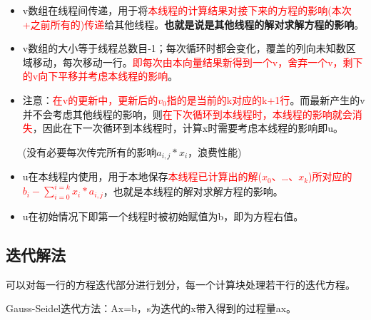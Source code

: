 \documentclass[UTF8]{article}%
\begin{document}
\begin{itemize}
    \item v数组在线程间传递，用于将\textcolor{red}{本线程的计算结果对接下来的方程的影响(本次+之前所有的)传递}给其他线程。\textbf{也就是说是其他线程的解对求解方程的影响}。
    \item v数组的大小等于线程总数目-1；每次循环时都会变化，覆盖的列向未知数区域移动，每次移动一行。\textcolor{red}{即每次由本向量结果新得到一个v，舍弃一个v，剩下的v向下平移并考虑本线程的影响}。
    \item 注意：\textcolor{red}{在v的更新中，更新后的$v_0$指的是当前的k对应的k+1行}。而最新产生的v并不会考虑其他线程的影响，则\textcolor{red}{在下次循环到本线程时，本线程的影响就会消失}，因此在下一次循环到本线程时，计算x时需要考虑本线程的影响即u。
    
    (没有必要每次传完所有的影响$a_{i,j}*x_i$，浪费性能)

    \item u在本线程内使用，用于本地保存\textcolor{red}{本线程已计算出的解($x_0$、\dots、$x_k$)所对应的$b_i-\sum_{i=0}^{i=k} x_i*a_{i,j}$}，也就是本线程的解对求解方程的影响。
    \item u在初始情况下即第一个线程时被初始赋值为b，即为方程右值。
\end{itemize}


\subsection{迭代解法}

可以对每一行的方程迭代部分进行划分，每一个计算块处理若干行的迭代方程。

Gauss-Seidel迭代方法：Ax=b，s为迭代的x带入得到的过程量ax。
\end{document}
